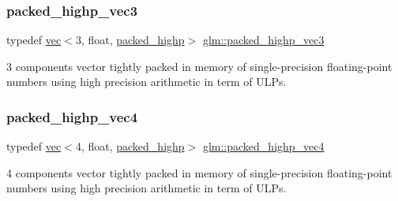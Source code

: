 \mbox{\label{group__gtc__type__aligned_ga6814dd861e658e724ce9e5e673a4486b}} 
\subsubsection{\texorpdfstring{packed\+\_\+highp\+\_\+vec3}{packed\_highp\_vec3}}
{\footnotesize\ttfamily typedef \mbox{\hyperlink{structglm_1_1vec}{vec}}$<$3, float, \mbox{\hyperlink{namespaceglm_a36ed105b07c7746804d7fdc7cc90ff25a8e8791ee77fe079b1291f710d88031bf}{packed\+\_\+highp}}$>$ \mbox{\hyperlink{group__gtc__type__aligned_ga6814dd861e658e724ce9e5e673a4486b}{glm\+::packed\+\_\+highp\+\_\+vec3}}}



3 components vector tightly packed in memory of single-\/precision floating-\/point numbers using high precision arithmetic in term of U\+L\+Ps. 

\mbox{\label{group__gtc__type__aligned_gabbc42b2b5ad854c60821526c4e291161}} 
\subsubsection{\texorpdfstring{packed\+\_\+highp\+\_\+vec4}{packed\_highp\_vec4}}
{\footnotesize\ttfamily typedef \mbox{\hyperlink{structglm_1_1vec}{vec}}$<$4, float, \mbox{\hyperlink{namespaceglm_a36ed105b07c7746804d7fdc7cc90ff25a8e8791ee77fe079b1291f710d88031bf}{packed\+\_\+highp}}$>$ \mbox{\hyperlink{group__gtc__type__aligned_gabbc42b2b5ad854c60821526c4e291161}{glm\+::packed\+\_\+highp\+\_\+vec4}}}



4 components vector tightly packed in memory of single-\/precision floating-\/point numbers using high precision arithmetic in term of U\+L\+Ps. 

